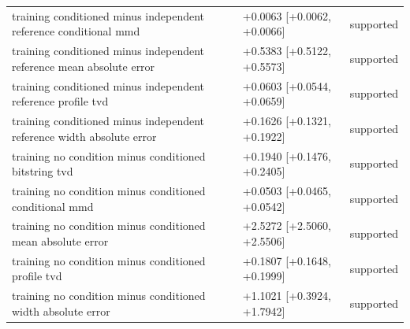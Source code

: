 \begin{table}[p]
\begin{tabular}{@{}p{}p{}p{}@{}}
training conditioned minus independent reference conditional mmd & +0.0063 [+0.0062, +0.0066] & supported \\
training conditioned minus independent reference mean absolute error & +0.5383 [+0.5122, +0.5573] & supported \\
training conditioned minus independent reference profile tvd & +0.0603 [+0.0544, +0.0659] & supported \\
training conditioned minus independent reference width absolute error & +0.1626 [+0.1321, +0.1922] & supported \\
training no condition minus conditioned bitstring tvd & +0.1940 [+0.1476, +0.2405] & supported \\
training no condition minus conditioned conditional mmd & +0.0503 [+0.0465, +0.0542] & supported \\
training no condition minus conditioned mean absolute error & +2.5272 [+2.5060, +2.5506] & supported \\
training no condition minus conditioned profile tvd & +0.1807 [+0.1648, +0.1999] & supported \\
training no condition minus conditioned width absolute error & +1.1021 [+0.3924, +1.7942] & supported \\
\bottomrule
\end{tabular}
\end{table}
